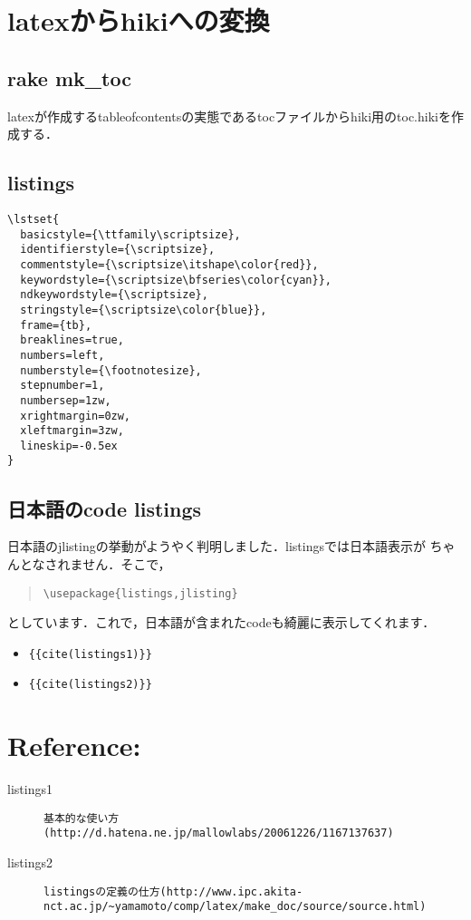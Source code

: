 \section{latexからhikiへの変換}
\subsection{rake mk\_toc}
latexが作成するtableofcontentsの実態であるtocファイルからhiki用のtoc.hikiを作成する．

\subsection{listings}\begin{lstlisting}[style=customTeX,basicstyle={\scriptsize\ttfamily}]
\lstset{
  basicstyle={\ttfamily\scriptsize},
  identifierstyle={\scriptsize},
  commentstyle={\scriptsize\itshape\color{red}},
  keywordstyle={\scriptsize\bfseries\color{cyan}},
  ndkeywordstyle={\scriptsize},
  stringstyle={\scriptsize\color{blue}},
  frame={tb},
  breaklines=true,
  numbers=left,
  numberstyle={\footnotesize},
  stepnumber=1,
  numbersep=1zw,
  xrightmargin=0zw,
  xleftmargin=3zw,
  lineskip=-0.5ex
}
\end{lstlisting}
\subsection{日本語のcode listings}
日本語のjlistingの挙動がようやく判明しました．listingsでは日本語表示が
ちゃんとなされません．そこで，
\begin{quote}\begin{verbatim}
\usepackage{listings,jlisting}
\end{verbatim}\end{quote}
としています．これで，日本語が含まれたcodeも綺麗に表示してくれます．

\begin{itemize}
\item \verb|{{cite(listings1)}}|
\item \verb|{{cite(listings2)}}|
\end{itemize}
\section{Reference:}\begin{description}
\item[listings1] \verb|基本的な使い方(http://d.hatena.ne.jp/mallowlabs/20061226/1167137637)|

\item[listings2] \verb|listingsの定義の仕方(http://www.ipc.akita-nct.ac.jp/~yamamoto/comp/latex/make_doc/source/source.html)|
\end{description}
